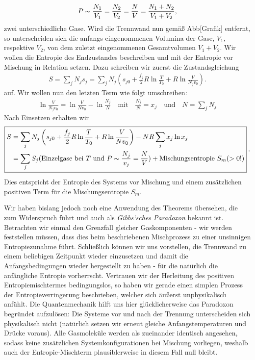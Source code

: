 \begin{align*}
    P\thicksim\frac{N_1}{V_1}=\frac{N_2}{V_2}=\frac{N}{V}=\frac{N_1+N_2}{V_1+V_2},
\end{align*}
zwei unterschiedliche Gase. Wird die Trennwand nun gemäß Abb[Grafik] entfernt, so unterscheiden sich die anfangs eingenommenen Volumina der Gase, $V_1$, respektive $V_2$, von dem zuletzt eingenommenen Gesamtvolumen $V_1+V_2$. 
Wir wollen die Entropie des Endzustandes beschreiben und mit der Entropie vor Mischung in Relation setzen. Dazu schreiben wir zuerst die Zustandsgleichung 
\begin{align*}
    S=\sum_jN_js_j=\sum_jN_j\left(s_{j0}+\frac{f_j}{2}R\ln\frac{T}{T_0}+R\ln\frac{V}{N_jv_0}\right).
\end{align*}
auf. Wir wollen nun den letzten Term wie folgt umschreiben: 
\begin{align*}
    \ln\frac{V}{N_jv_0}=\ln\frac{V}{Nv_0}-\ln\frac{N_j}{N}\quad\text{mit}\quad\frac{N_j}{N}=x_j\quad\text{und}\quad N=\sum_jN_j
\end{align*}
Nach Einsetzen erhalten wir 
\begin{align*}
    \boxed{
    \begin{aligned}
        S&=\sum_jN_j\left(s_{j0}+\frac{f_j}{2}R\ln\frac{T}{T_0}+R\ln\frac{V}{Nv_0}\right)-NR\sum_jx_j\ln x_j\\
        &=\sum_jS_j(\text{Einzelgase bei $T$ und }P\thicksim \frac{N_j}{v_j}=\frac{N}{V})+\text{Mischungsentropie $S_m(>0!)$}
    \end{aligned}
    }\:.
\end{align*}
Dies entspricht der Entropie des Systems vor Mischung und einem zusätzlichen positiven Term für die Mischungsentropie $S_m$.

Wir haben bislang jedoch noch eine Anwendung des Theorems übersehen, die zum Widerspruch führt und auch als \emph{Gibbs‘sches Paradoxon} bekannt ist.
Betrachten wir einmal den Grenzfall gleicher Gaskomponenten - wir werden feststellen müssen, dass dies beim beschriebenen Mischprozess zu einer unsinnigen Entropiezunahme führt. Schließlich können wir uns vorstellen, die Trennwand zu einem beliebigen Zeitpunkt wieder einzusetzen und damit die Anfangsbedingungen wieder hergestellt zu haben - für die natürlich die anfängliche Entropie vorherrscht. Vertrauen wir der Herleitung des positiven Entropiemischtermes bedingungslos, so haben wir gerade einen simplen Prozess der Entropieverringerung beschrieben, welcher sich äußerst unphysikalisch anfühlt. Die Quantenmechanik hilft uns hier glücklicherweise das Paradoxon begründet aufzulösen: Die Systeme vor und nach der Trennung unterscheiden sich physikalisch nicht (natürlich setzen wir erneut gleiche Anfangstemperaturen und Drücke voraus). Alle Gasmoleküle werden als zueinander identisch angesehen, sodass keine zusätzlichen Systemkonfigurationen bei Mischung vorliegen, weshalb auch der Entropie-Mischterm plausiblerweise in diesem Fall null bleibt. 
	
